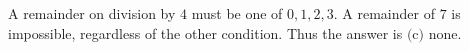 A remainder on division by $4$ must be one of $0,1,2,3$. A remainder of $7$ is impossible, regardless of the other condition. Thus the answer is $\boxed{\text{(c) none}}$.
